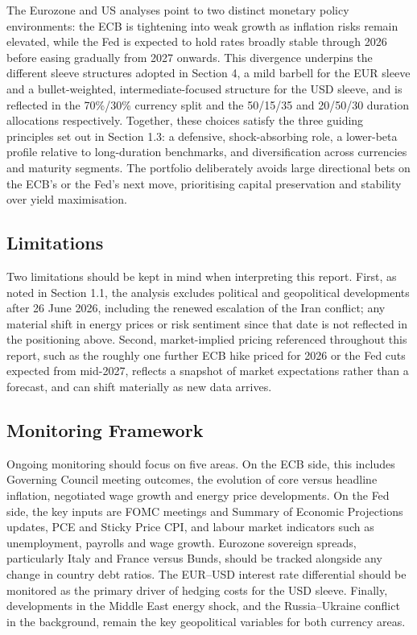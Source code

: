 \documentclass[11pt,a4paper]{article}
\begin{document}
The Eurozone and US analyses point to two distinct monetary policy environments: the ECB is tightening into weak growth as inflation risks remain elevated, while the Fed is expected to hold rates broadly stable through 2026 before easing gradually from 2027 onwards. This divergence underpins the different sleeve structures adopted in Section 4, a mild barbell for the EUR sleeve and a bullet-weighted, intermediate-focused structure for the USD sleeve, and is reflected in the 70\%/30\% currency split and the 50/15/35 and 20/50/30 duration allocations respectively. Together, these choices satisfy the three guiding principles set out in Section 1.3: a defensive, shock-absorbing role, a lower-beta profile relative to long-duration benchmarks, and diversification across currencies and maturity segments. The portfolio deliberately avoids large directional bets on the ECB's or the Fed's next move, prioritising capital preservation and stability over yield maximisation.

\subsection{Limitations}

Two limitations should be kept in mind when interpreting this report. First, as noted in Section 1.1, the analysis excludes political and geopolitical developments after 26 June 2026, including the renewed escalation of the Iran conflict; any material shift in energy prices or risk sentiment since that date is not reflected in the positioning above. Second, market-implied pricing referenced throughout this report, such as the roughly one further ECB hike priced for 2026 or the Fed cuts expected from mid-2027, reflects a snapshot of market expectations rather than a forecast, and can shift materially as new data arrives.

\subsection{Monitoring Framework}

Ongoing monitoring should focus on five areas. On the ECB side, this includes Governing Council meeting outcomes, the evolution of core versus headline inflation, negotiated wage growth and energy price developments. On the Fed side, the key inputs are FOMC meetings and Summary of Economic Projections updates, PCE and Sticky Price CPI, and labour market indicators such as unemployment, payrolls and wage growth. Eurozone sovereign spreads, particularly Italy and France versus Bunds, should be tracked alongside any change in country debt ratios. The EUR--USD interest rate differential should be monitored as the primary driver of hedging costs for the USD sleeve. Finally, developments in the Middle East energy shock, and the Russia--Ukraine conflict in the background, remain the key geopolitical variables for both currency areas.
\end{document}
